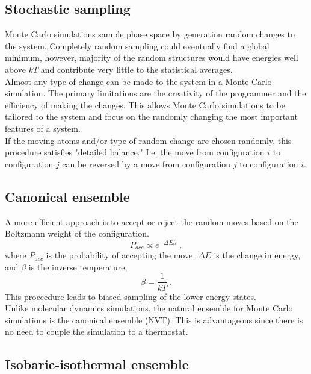 \documentclass[12pt]{report}
\begin{document}
\subsection{Stochastic sampling}

Monte Carlo simulations sample phase space by generation random changes to
the system. Completely random sampling could eventually find a global
minimum, however, majority of the random structures would have energies well
above $kT$ and contribute very little to the statistical averages. \\

Almost any type of change can be made to the system in a Monte Carlo
simulation. The primary limitations are the creativity of the programmer and
the efficiency of making the changes. This allows Monte Carlo simulations to
be tailored to the system and focus on the randomly changing the most important
features of a system. \\

If the moving atoms and/or type of random change are chosen randomly, this
procedure satisfies "detailed balance." I.e. the move from configuration $i$
to configuration $j$ can be reversed by a move from configuration $j$ to
configuration $i$.

\subsection{Canonical ensemble}

A more efficient approach is to accept or reject the random moves based on
the Boltzmann weight of the configuration.
\begin{equation}
 P_{acc} \propto e^{-\Delta E\beta} \; ,
\end{equation}
where $P_{acc}$ is the probability of accepting the move, $\Delta E$ is the 
change in energy, and $\beta$ is the inverse temperature,
\begin{equation} 
 \beta = \frac{1}{kT} \; .
\end{equation}
This proceedure leads to biased sampling of the lower energy states. \\

Unlike molecular dynamics simulations, the natural ensemble for Monte Carlo
simulations is the canonical ensemble (NVT). This is advantageous since there
is no need to couple the simulation to a thermostat.

\subsection{Isobaric-isothermal ensemble}
\end{document}
